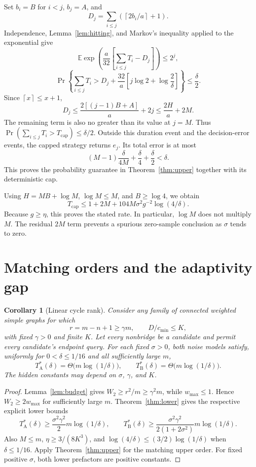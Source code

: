 \documentclass[11pt,letterpaper]{article}
\newtheorem{corollary}[theorem]{Corollary}
\newcommand{\ceil}[1]{\left\lceil #1\right\rceil}
\begin{document}
Set $b_i=B$ for $i<j$, $b_j=A$, and
\[
 D_j=\sum_{i\le j}\left(\ceil{2b_i/a}+1\right).
\]
Independence, Lemma~\ref{lem:hitting}, and Markov's inequality applied to the exponential give
\[
 \mathbb E\exp\left(\frac a{32}\left[\sum_{i\le j}T_i-D_j\right]\right)\le2^j,
\]
\[
 \Pr\left\{\sum_{i\le j}T_i>D_j+
 \frac{32}{a}\left[j\log2+\log\frac2\delta\right]\right\}\le\frac\delta2.
\]
Since $\ceil{x}\le x+1$,
\[
 D_j\le\frac{2[(j-1)B+A]}a+2j\le\frac{2H}a+2M.
\]
The remaining term is also no greater than its value at $j=M$. Thus $\Pr(\sum_{i\le j}T_i>T_{\mathrm{cap}})\le\delta/2$. Outside this duration event and the decision-error events, the capped strategy returns $e_j$. Its total error is at most
\[
 (M-1)\frac\delta{4M}+\frac\delta4+\frac\delta2<\delta.
\]
This proves the probability guarantee in Theorem~\ref{thm:upper} together with its deterministic cap.

Using $H=MB+\log M$, $\log M\le M$, and $B\ge\log4$, we obtain
\[
 T_{\mathrm{cap}}\le1+2M+104M\sigma^2g^{-2}\log(4/\delta).
\]
Because $g\ge\eta$, this proves the stated rate. In particular, $\log M$ does not multiply $M$. The residual $2M$ term prevents a spurious zero-sample conclusion as $\sigma$ tends to zero.

\section{Matching orders and the adaptivity gap}
\begin{corollary}[Linear cycle rank]\label{cor:matching}
Consider any family of connected weighted simple graphs for which
\[
 r=m-n+1\ge\gamma m,\qquad D/c_{\min}\le K,
\]
with fixed $\gamma>0$ and finite $K$. Let every nonbridge be a candidate and permit every candidate's endpoint query. For each fixed $\sigma>0$, both noise models satisfy, uniformly for $0<\delta\le1/16$ and all sufficiently large $m$,
\[
 T^*_{\mathrm A}(\delta)=\Theta\bigl(m\log(1/\delta)\bigr),\qquad
 T^*_{\mathrm B}(\delta)=\Theta\bigl(m\log(1/\delta)\bigr).
\]
The hidden constants may depend on $\sigma$, $\gamma$, and $K$.
\end{corollary}
\begin{proof}
Lemma~\ref{lem:budget} gives $W_2\ge r^2/m\ge\gamma^2m$, while $w_{\max}\le1$. Hence $W_2\ge2w_{\max}$ for sufficiently large $m$. Theorem~\ref{thm:lower} gives the respective explicit lower bounds
\[
 T^*_{\mathrm A}(\delta)\ge\frac{\sigma^2\gamma^2}2m\log(1/\delta),\qquad
 T^*_{\mathrm B}(\delta)\ge\frac{\sigma^2\gamma^2}{2(1+2\sigma^2)}m\log(1/\delta).
\]
Also $M\le m$, $\eta\ge3/(8K^3)$, and $\log(4/\delta)\le(3/2)\log(1/\delta)$ when $\delta\le1/16$. Apply Theorem~\ref{thm:upper} for the matching upper order. For fixed positive $\sigma$, both lower prefactors are positive constants.
\end{proof}
\end{document}
